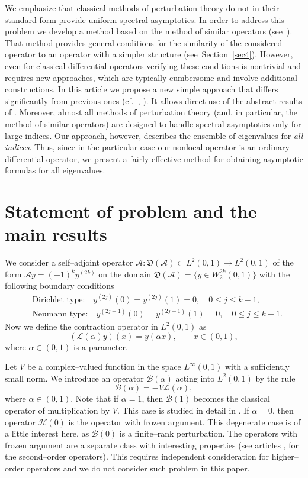 \documentclass[11pt,centertags,reqno,twoside]{amsart}
\numberwithin{equation}{section}
\theoremstyle{definition}
\theoremstyle{remark}
\begin{document}
We emphasize that classical methods of perturbation theory do not in their standard form provide uniform spectral asymptotics.
In order to address this problem we develop a method based on the method of similar operators (see~\cite{BaskKrUsk}).
That method provides general conditions for the similarity of the considered operator to an operator with a simpler
structure (see~Section~\ref{sec4}). However, even for classical differential operators verifying these conditions is nontrivial
and requires new approaches, which are typically cumbersome and involve additional constructions. In this article we propose a new
simple approach that differs significantly from previous ones (cf.~\cite{BorPolIzv}, \cite{PolyakovM2AS}). It allows
direct use of the abstract results of \cite{BaskKrUsk}. Moreover, almost all
methods of perturbation theory (and, in particular, the method of similar operators)
are designed to handle spectral asymptotics only for large indices. Our approach, however,
describes the ensemble of eigenvalues for \emph{all indices}. Thus, since in the
particular case our nonlocal operator is an ordinary differential operator, we
present a fairly effective method for obtaining asymptotic formulas for all eigenvalues.

\section{Statement of problem and the main results}

We consider a self--adjoint operator $\mathcal{A}: \mathfrak{D}(\mathcal{A})\subset L^2(0, 1)
\to L^2(0, 1)$ of the form $\mathcal{A}y=(-1)^ky^{(2k)}$ on the domain
$\mathfrak{D}(\mathcal{A})=\{y\in W_2^{2k}(0, 1)\}$ with the following boundary conditions
\begin{align*}
&\text{Dirichlet type:}\quad y^{(2j)}(0)=y^{(2j)}(1)=0, \quad 0\leqslant
j\leqslant k-1, \\
&\text{Neumann type:}\quad y^{(2j+1)}(0)=y^{(2j+1)}(1)=0,
\quad 0\leqslant j\leqslant k-1.
\end{align*}
Now we define the contraction operator in $L^2(0, 1)$ as
\[
(\mathcal{L}(\alpha)y)(x)=y(\alpha x), \qquad x\in (0, 1),
\]
where $\alpha\in (0, 1)$ is a parameter.

Let $V$ be a complex--valued function in the space $L^\infty(0, 1)$ with a sufficiently small norm.
We introduce an operator $\mathcal{B}(\alpha)$ acting into $L^2(0, 1)$ by the rule
\begin{equation}\label{B}
\mathcal{B}(\alpha)=-V\mathcal{L}(\alpha),
\end{equation}
where $\alpha\in (0, 1)$. Note that if $\alpha=1$, then $\mathcal{B}(1)$ becomes the
classical operator of multiplication by $V$. This case is studied in
detail in \cite{PolyakovM2AS}. If $\alpha=0$, then operator $\mathcal{H}(0)$
is the operator with frozen argument. This degenerate case is of a little interest
here, as $\mathcal{B}(0)$ is a finite--rank perturbation.
The operators with frozen argument are a separate class
with interesting properties (see articles \cite{BondButVas}, \cite{BondHuYang}
for the second--order operators). This requires independent consideration
for higher--order operators and we do not consider such problem in this paper.
\end{document}
